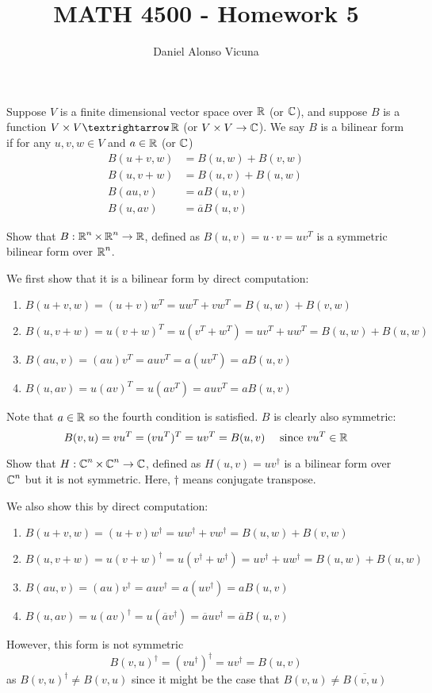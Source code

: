 \documentclass[11pt,onecolumn]{article}
\title{MATH 4500 - Homework 5}
\author{Daniel Alonso Vicuna}
\begin{document}
\maketitle
\begin{definition}
Suppose $V$ is a finite dimensional vector space over $\operatorname{\mathbb{R}}$ (or $\operatorname{\mathbb{C}}$), and suppose $B$ is a function $V \times V → \real$ (or $V \times V \rightarrow \operatorname{\mathbb{C}}$).
We say $B$ is a bilinear form if for any $u, v, w \in V$ and $a \in \operatorname{\mathbb{R}}$ (or $\operatorname{\mathbb{C}}$)
\begin{align}
B(u + v, w) &= B(u, w) + B(v, w) \\
B(u, v + w) &= B(u, v) + B(u, w) \\
B(au, v) &= aB(u, v) \\
B(u, av) &= \overline{a}B(u, v)    
\end{align}
\end{definition}
\begin{exercise}
Show that $B : \operatorname{\mathbb{R}}^n \times \operatorname{\mathbb{R}}^n \rightarrow \operatorname{\mathbb{R}}$, defined as $B(u, v) = u \cdot v = uv^T$ is a symmetric bilinear form over $\operatorname{\mathbb{R}}^n$.
\end{exercise}
\begin{answer}
We first show that it is a bilinear form by direct computation:
\begin{enumerate}
    \item $B(u+v,w) = (u+v)w^T = uw^T + vw^T = B(u,w) + B(v,w)$
    \item $B(u,v+w) = u(v+w)^T = u(v^T+w^T) = uv^T+uw^T = B(u,w) + B(u,w)$
    \item $B(au,v) = (au)v^T = auv^T = a(uv^T) = aB(u,v)$
    \item $B(u,av) = u(av)^T = u(av^T) = auv^T = aB(u,v)$
\end{enumerate}
Note that $a\in \operatorname{\mathbb{R}}$ so the fourth condition is satisfied. $B$ is clearly also symmetric:
$$ B(v,u) = vu^T = (vu^T)^T = uv^T = B(u,v) \quad \text{ since } vu^T \in \operatorname{\mathbb{R}}$$
\end{answer}
\begin{exercise}
Show that $H : \operatorname{\mathbb{C}}^n \times \operatorname{\mathbb{C}}^n \rightarrow \operatorname{\mathbb{C}}$, defined as $H(u, v) = uv^\dagger$ is a bilinear form over $\operatorname{\mathbb{C}}^n$ but it is not symmetric. Here, $\dagger$ means conjugate transpose.
\end{exercise}
\begin{answer}
We also show this by direct computation:
\begin{enumerate}
    \item $B(u+v,w) = (u+v)w^\dagger = uw^\dagger + vw^\dagger = B(u,w) + B(v,w)$
    \item $B(u,v+w) = u(v+w)^\dagger = u(v^\dagger+w^\dagger) = uv^\dagger+uw^\dagger = B(u,w) + B(u,w)$
    \item $B(au,v) = (au)v^\dagger = auv^\dagger = a(uv^\dagger) = aB(u,v)$
    \item $B(u,av) = u(av)^\dagger = u(\overline{a}v^\dagger) = \overline{a}uv^\dagger = \overline{a}B(u,v)$
\end{enumerate}
However, this form is not symmetric
$$B(v,u)^\dagger = (vu^\dagger)^\dagger = uv^\dagger = B(u,v)$$
as $B(v,u)^\dagger \neq B(v,u)$ since it might be the case that $B(v,u) \neq \overline{B(v,u)}$
\end{answer}
\end{document}
